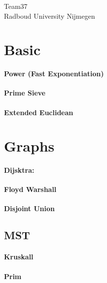 \documentclass[a4paper]{article}
\begin{document}
\null\vfill
\begin{center}
{\huge Team37}\\
\vspace{10cm}
{\large Radboud University Nijmegen}
\end{center}
\vfill
\thispagestyle{empty} %
\newpage

\clearpage
\setcounter{page}{1}


\section{Basic} 
\paragraph{Power (Fast Exponentiation)} \hfill

\paragraph{Prime Sieve} \hfill

\paragraph{Extended Euclidean} \hfill

\section{Graphs}
\paragraph{Dijsktra:} \hfill

\paragraph{Floyd Warshall} \hfill

\paragraph{Disjoint Union} \hfill

\subsection{MST}
\paragraph{Kruskall} \hfill

\paragraph{Prim} \hfill

\end{document}
